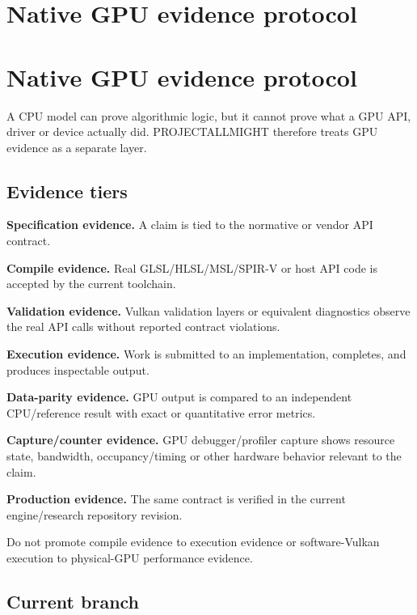 \hypertarget{appendix-1680333ac796}{}
\section*{Native GPU evidence protocol}
\section{Native GPU evidence protocol}\label{appendix-1680333ac796-native-gpu-evidence-protocol}

A CPU model can prove algorithmic logic, but it cannot prove what a GPU API, driver or device actually did. PROJECTALLMIGHT therefore treats GPU evidence as a separate layer.

\subsection{Evidence tiers}\label{appendix-1680333ac796-evidence-tiers}

\textbf{Specification evidence.} A claim is tied to the normative or vendor API contract.

\textbf{Compile evidence.} Real GLSL/HLSL/MSL/SPIR-V or host API code is accepted by the current toolchain.

\textbf{Validation evidence.} Vulkan validation layers or equivalent diagnostics observe the real API calls without reported contract violations.

\textbf{Execution evidence.} Work is submitted to an implementation, completes, and produces inspectable output.

\textbf{Data-parity evidence.} GPU output is compared to an independent CPU/reference result with exact or quantitative error metrics.

\textbf{Capture/counter evidence.} GPU debugger/profiler capture shows resource state, bandwidth, occupancy/timing or other hardware behavior relevant to the claim.

\textbf{Production evidence.} The same contract is verified in the current engine/research repository revision.

Do not promote compile evidence to execution evidence or software-Vulkan execution to physical-GPU performance evidence.

\subsection{Current branch}\label{appendix-1680333ac796-current-branch}


